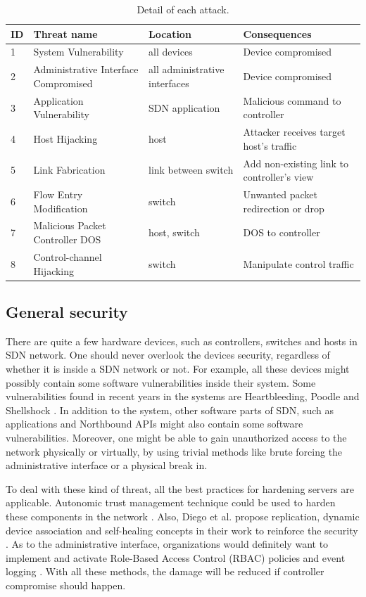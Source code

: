 \begin{table}[H]
\centering
\caption{Detail of each attack.}
\begin{tabular}{|l|p{4cm}|p{3.2cm}|p{5cm}|}
\hline ID & Threat name	& Location & Consequences \\
\hline
\hline 1 & System Vulnerability & all devices & Device compromised\\
\hline 2 & Administrative Interface Compromised & all administrative interfaces & Device compromised \\
\hline 3 & Application Vulnerability & SDN application & Malicious command to controller \\
\hline 4 & Host Hijacking & host & Attacker receives target host's traffic \\
\hline 5 & Link Fabrication & link between switch & Add non-existing link to controller's view \\
\hline 6 & Flow Entry Modification & switch & Unwanted packet redirection or drop \\
\hline 7 & Malicious Packet Controller DOS  & host, switch & DOS to controller \\
\hline 8 & Control-channel Hijacking & switch & Manipulate control traffic \\
\hline 
\end{tabular}
\label{table:sdn_threats}
\end{table}

\subsection{General security}
There are quite a few hardware devices, such as controllers, switches and hosts in SDN network. One should never overlook the devices security, regardless of whether it is inside a SDN network or not. For example, all these devices might possibly contain some software vulnerabilities inside their system. Some vulnerabilities found in recent years in the systems are Heartbleeding, Poodle and Shellshock \cite{HB,POODLE,SHELLSHOCK}. In addition to the system, other software parts of SDN, such as applications and Northbound APIs might also contain some software vulnerabilities. Moreover, one might be able to gain unauthorized access to the network physically or virtually, by using trivial methods like brute forcing the administrative interface or a physical break in. 

To deal with these kind of threat, all the best practices for hardening servers are applicable. Autonomic trust management technique could be used to harden these components in the network \cite{YZP11}. Also, Diego et al. propose replication, dynamic device association and self-healing concepts in their work to reinforce the security \cite{KDFRV13}. As to the administrative interface, organizations would definitely want to implement and activate Role-Based Access Control (RBAC) policies and event logging \cite{FFR09}. With all these methods, the damage will be reduced if controller compromise should happen.

